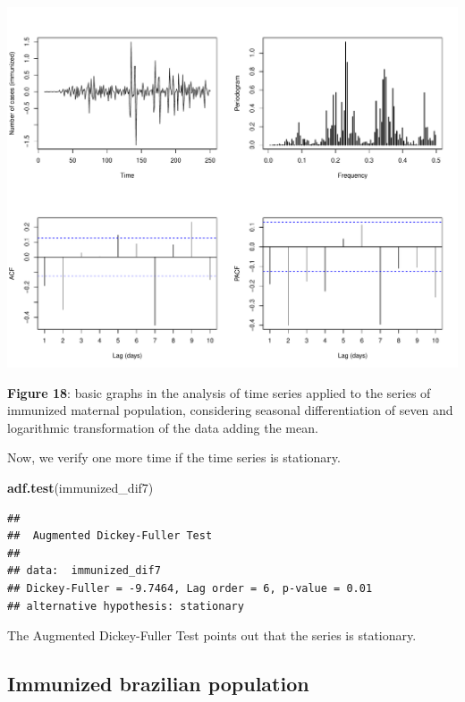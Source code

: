 \documentclass[
]{article}
\newenvironment{Shaded}{\begin{snugshade}}{\end{snugshade}}
\newcommand{\FunctionTok}[1]{\textcolor[rgb]{0.13,0.29,0.53}{\textbf{#1}}}
\newcommand{\NormalTok}[1]{#1}
\renewenvironment{Shaded}{\begin{mdframed}[ backgroundcolor=shadecolor, linecolor = shadecolor, leftmargin=\dimexpr\leftmargin-2pt\relax, innerleftmargin=1.6pt, innertopmargin=5pt, skipabove=10pt,skipbelow=3pt ]}{\end{mdframed}}
\begin{document}
\begin{center}\includegraphics[width=\linewidth]{IF_results_ENG_files/figure-latex/unnamed-chunk-22-1} \end{center}

\textbf{Figure 18}: basic graphs in the analysis of time series applied
to the series of immunized maternal population, considering seasonal
differentiation of seven and logarithmic transformation of the data
adding the mean.

Now, we verify one more time if the time series is stationary.

\begin{Shaded}
\begin{Highlighting}[]
\FunctionTok{adf.test}\NormalTok{(immunized\_dif7)}
\end{Highlighting}
\end{Shaded}

\begin{verbatim}
## 
##  Augmented Dickey-Fuller Test
## 
## data:  immunized_dif7
## Dickey-Fuller = -9.7464, Lag order = 6, p-value = 0.01
## alternative hypothesis: stationary
\end{verbatim}

The Augmented Dickey-Fuller Test points out that the series is
stationary.

\subsection{Immunized brazilian
population}\label{immunized-brazilian-population}
\end{document}
